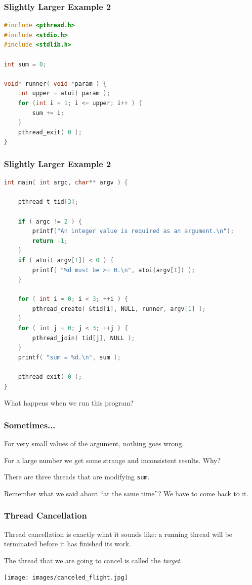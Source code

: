 \begin{frame}[fragile]
	\frametitle{Slightly Larger Example 2}

	\begin{lstlisting}[language=C]
#include <pthread.h>
#include <stdio.h>
#include <stdlib.h>

int sum = 0;

void* runner( void *param ) {
    int upper = atoi( param );
    for (int i = 1; i <= upper; i++ ) {
        sum += i;
    }
    pthread_exit( 0 );
}
\end{lstlisting}


\end{frame}

\begin{frame}[fragile]
	\frametitle{Slightly Larger Example 2}


	\begin{lstlisting}[language=C]
int main( int argc, char** argv ) {

    pthread_t tid[3];

    if ( argc != 2 ) {
        printf("An integer value is required as an argument.\n");
        return -1;
    }
    if ( atoi( argv[1]) < 0 ) {
        printf( "%d must be >= 0.\n", atoi(argv[1]) );
    }

    for ( int i = 0; i < 3; ++i ) {
        pthread_create( &tid[i], NULL, runner, argv[1] );
    }
    for ( int j = 0; j < 3; ++j ) {
        pthread_join( tid[j], NULL );
    }
    printf( "sum = %d.\n", sum );

    pthread_exit( 0 );
}
\end{lstlisting}

	What happens when we run this program?

\end{frame}


\begin{frame}
	\frametitle{Sometimes...}

	For very small values of the argument, nothing goes wrong.

	For a large number we get some strange and inconsistent results. Why?

	There are three threads that are modifying \texttt{sum}.

	Remember what we said about ``at the same time''? We have to come back to it.

\end{frame}

\begin{frame}
	\frametitle{Thread Cancellation}

	Thread cancellation is exactly what it sounds like: a running thread will be terminated before it has finished its work.

	The thread that we are going to cancel is called the \textit{target}.

	\begin{center}
		\texttt{[image: images/canceled\_flight.jpg]}
	\end{center}

\end{frame}


